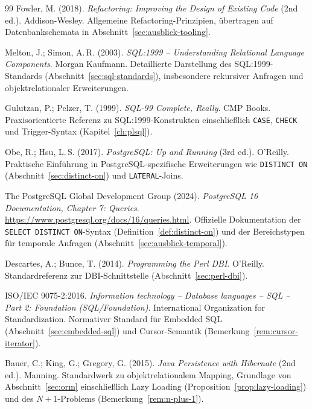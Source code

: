 ﻿\documentclass[a4paper,12pt]{report}
\theoremstyle{definition}
\theoremstyle{remark}
\begin{document}
\begin{thebibliography}{99}
Fowler, M. (2018).
\newblock \emph{Refactoring: Improving the Design of Existing Code}
(2nd ed.).
\newblock Addison-Wesley.
\newblock Allgemeine Refactoring-Prinzipien, übertragen auf
Datenbankschemata in Abschnitt~\ref{sec:ausblick-tooling}.

Melton, J.; Simon, A.\,R. (2003).
\newblock \emph{SQL:1999 -- Understanding Relational Language Components}.
\newblock Morgan Kaufmann.
\newblock Detaillierte Darstellung des SQL:1999-Standards
(Abschnitt~\ref{sec:sql-standards}), insbesondere rekursiver Anfragen
und objektrelationaler Erweiterungen.

Gulutzan, P.; Pelzer, T. (1999).
\newblock \emph{SQL-99 Complete, Really}.
\newblock CMP Books.
\newblock Praxisorientierte Referenz zu SQL:1999-Konstrukten
einschließlich \texttt{CASE}, \texttt{CHECK} und
Trigger-Syntax (Kapitel~\ref{ch:plsql}).

Obe, R.; Hsu, L.\,S. (2017).
\newblock \emph{PostgreSQL: Up and Running} (3rd ed.).
\newblock O'Reilly.
\newblock Praktische Einführung in PostgreSQL-spezifische
Erweiterungen wie \texttt{DISTINCT ON}
(Abschnitt~\ref{sec:distinct-on}) und \texttt{LATERAL}-Joins.

The PostgreSQL Global Development Group (2024).
\newblock \emph{PostgreSQL 16 Documentation, Chapter 7: Queries}.
\newblock \url{https://www.postgresql.org/docs/16/queries.html}.
\newblock Offizielle Dokumentation der \texttt{SELECT
DISTINCT ON}-Syntax (Definition~\ref{def:distinct-on}) und der
Bereichstypen für temporale Anfragen
(Abschnitt~\ref{sec:ausblick-temporal}).


Descartes, A.; Bunce, T. (2014).
\newblock \emph{Programming the Perl DBI}.
\newblock O'Reilly.
\newblock Standardreferenz zur DBI-Schnittstelle
(Abschnitt~\ref{sec:perl-dbi}).

ISO/IEC 9075-2:2016.
\newblock \emph{Information technology -- Database languages -- SQL --
Part 2: Foundation (SQL/Foundation)}.
\newblock International Organization for Standardization.
\newblock Normativer Standard für Embedded SQL
(Abschnitt~\ref{sec:embedded-sql}) und Cursor-Semantik
(Bemerkung~\ref{rem:cursor-iterator}).

Bauer, C.; King, G.; Gregory, G. (2015).
\newblock \emph{Java Persistence with Hibernate} (2nd ed.).
\newblock Manning.
\newblock Standardwerk zu objektrelationalem Mapping,
Grundlage von Abschnitt~\ref{sec:orm} einschließlich Lazy Loading
(Proposition~\ref{prop:lazy-loading}) und des
$N{+}1$-Problems (Bemerkung~\ref{rem:n-plus-1}).


\end{thebibliography}
\end{document}
